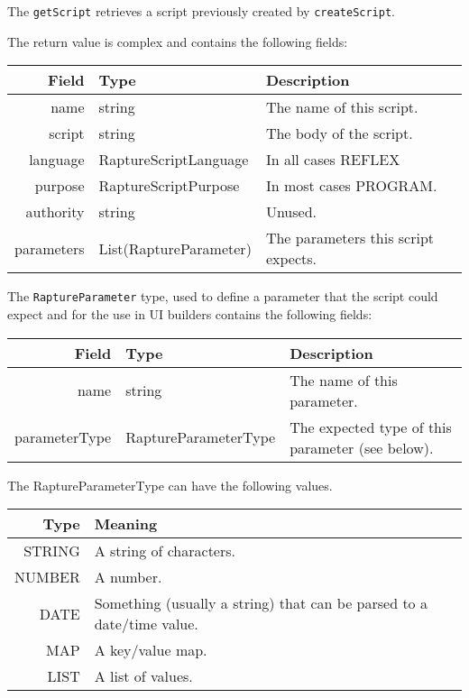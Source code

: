 The \verb+getScript+ retrieves a script previously created by \verb+createScript+.

The return value is complex and contains the following fields:

\begin{table}[h]
\begin{center}
\begin{tabular}{r l p{8cm}}
  Field & Type & Description \\
  \hline
  name & string & The name of this script.\\
  script & string & The body of the script.\\
  language & RaptureScriptLanguage & In all cases REFLEX \\
  purpose & RaptureScriptPurpose & In most cases PROGRAM.\\
  authority & string &  Unused.\\
  parameters & List(RaptureParameter) & The parameters this script expects.\\
\end{tabular}
\end{center}
\end{table}

The \verb+RaptureParameter+ type, used to define a parameter that the script could expect
and for the use in UI builders contains the following fields:

\begin{table}[h]
\begin{center}
\begin{tabular}{r l p{6cm}}
  Field & Type & Description \\
  \hline
  name & string & The name of this parameter.\\
  parameterType & RaptureParameterType & The expected type of this parameter (see below).\\
\end{tabular}
\end{center}
\end{table}

The RaptureParameterType can have the following values.

\begin{table}[h]
\begin{center}
\begin{tabular}{r p{10cm}}
  Type & Meaning \\
  \hline
  STRING & A string of characters.\\
  NUMBER & A number.\\
  DATE & Something (usually a string) that can be parsed to a date/time value.\\
  MAP & A key/value map.\\
  LIST & A list of values.\\
\end{tabular}
\end{center}
\end{table}
